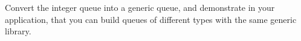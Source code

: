 Convert the integer queue into a generic queue, and demonstrate in your application, that you can build queues of different types with the same generic library.